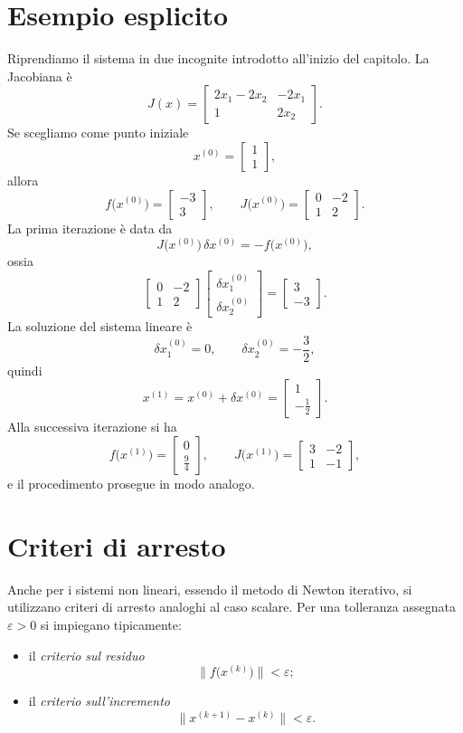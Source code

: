 \documentclass[11pt,a4paper]{report}
\begin{document}
\section{Esempio esplicito}
Riprendiamo il sistema in due incognite introdotto all'inizio del capitolo.
La Jacobiana \`e
\[
 J(x)=
 \begin{bmatrix}
  2x_1-2x_2 & -2x_1\\
  1 & 2x_2
 \end{bmatrix}.
\]
Se scegliamo come punto iniziale
\[
 x^{(0)}=
 \begin{bmatrix}
 1\\ 1
 \end{bmatrix},
\]
allora
\[
 f\bigl(x^{(0)}\bigr)=
 \begin{bmatrix}
 -3\\ 3
 \end{bmatrix},
 \qquad
 J\bigl(x^{(0)}\bigr)=
 \begin{bmatrix}
 0 & -2\\
 1 & 2
 \end{bmatrix}.
\]
La prima iterazione \`e data da
\[
 J\bigl(x^{(0)}\bigr)\,\delta x^{(0)}=-f\bigl(x^{(0)}\bigr),
\]
ossia
\[
 \begin{bmatrix}
 0 & -2\\
 1 & 2
 \end{bmatrix}
 \begin{bmatrix}
 \delta x_1^{(0)}\\ \delta x_2^{(0)}
 \end{bmatrix}
 =
 \begin{bmatrix}
 3\\ -3
 \end{bmatrix}.
\]
La soluzione del sistema lineare \`e
\[
 \delta x_1^{(0)}=0,
 \qquad
 \delta x_2^{(0)}=-\frac32,
\]
quindi
\[
 x^{(1)}=x^{(0)}+\delta x^{(0)}=
 \begin{bmatrix}
 1\\ -\frac12
 \end{bmatrix}.
\]
Alla successiva iterazione si ha
\[
 f\bigl(x^{(1)}\bigr)=
 \begin{bmatrix}
 0\\ \frac94
 \end{bmatrix},
 \qquad
 J\bigl(x^{(1)}\bigr)=
 \begin{bmatrix}
 3 & -2\\
 1 & -1
 \end{bmatrix},
\]
e il procedimento prosegue in modo analogo.

\section{Criteri di arresto}
Anche per i sistemi non lineari, essendo il metodo di Newton iterativo, si utilizzano criteri di arresto analoghi al caso scalare.
Per una tolleranza assegnata $\varepsilon>0$ si impiegano tipicamente:
\begin{itemize}
  \item il \emph{criterio sul residuo}
  \[
  \|f\bigl(x^{(k)}\bigr)\|<\varepsilon;
  \]
  \item il \emph{criterio sull'incremento}
  \[
  \|x^{(k+1)}-x^{(k)}\|<\varepsilon.
  \]
\end{itemize}
\end{document}
